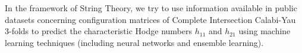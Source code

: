 In the framework of String Theory, we try to use information available in public datasets concerning configuration matrices of Complete Intersection Calabi-Yau 3-folds to predict the characteristic Hodge numbers $h_{11}$ and $h_{21}$ using machine learning techniques (including neural networks and ensemble learning).